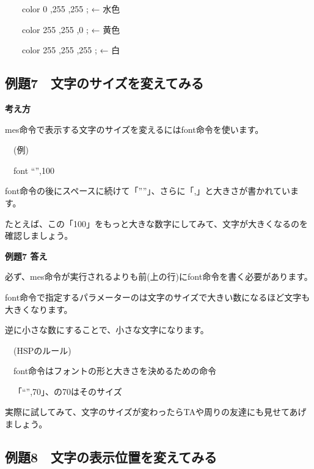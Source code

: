 \documentclass[a4paper,12pt]{jarticle}
\begin{document}
\ \ \ \ color 0 ,255 ,255 ; ← 水色 

\ \ \ \ color 255 ,255 ,0 ; ← 黄色 

\ \ \ \ color 255 ,255 ,255 ; ← 白 


\bigskip
\bigskip



\clearpage
\subsection{例題7　文字のサイズを変えてみる}
\bigskip
\bigskip

{\bfseries
考え方}

\bigskip

mes命令で表示する文字のサイズを変えるにはfont命令を使います。


\bigskip

\ \ (例)

\ \ font “”,100


\bigskip

font命令の後にスペースに続けて「””」、さらに「,」と大きさが書かれています。

たとえば、この「100」をもっと大きな数字にしてみて、文字が大きくなるのを確認しましょう。

\bigskip

\bigskip

{\bfseries
例題7 答え}

\bigskip

必ず、mes命令が実行されるよりも前(上の行)にfont命令を書く必要があります。

font命令で指定するパラメーターのは文字のサイズで大きい数になるほど文字も大きくなります。

逆に小さな数にすることで、小さな文字になります。


\bigskip

\ \ (HSPのルール)


\bigskip

\ \ font命令はフォントの形と大きさを決めるための命令

\ \ 「“”,70」、の70はそのサイズ


\bigskip

実際に試してみて、文字のサイズが変わったらTAや周りの友達にも見せてあげましょう。


\clearpage
\subsection{例題8　文字の表示位置を変えてみる}
\bigskip
\bigskip
\end{document}
